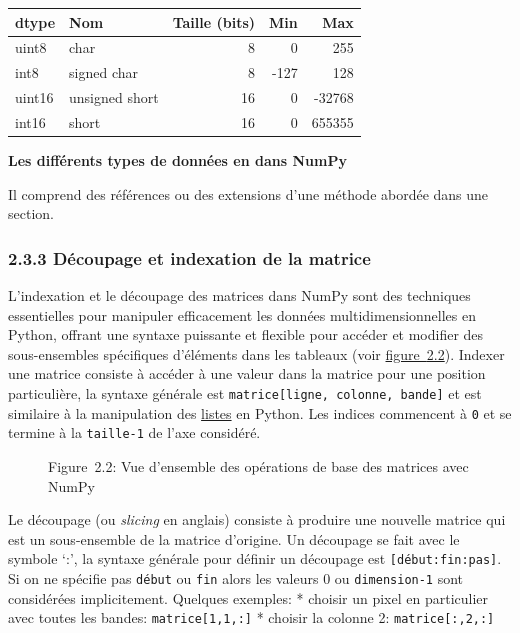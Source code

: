 \label{tbl-numpytype}
\begin{longtable}[]{@{}llrrr@{}}
\toprule\noalign{}
dtype & Nom & Taille (bits) & Min & Max \\
\midrule\noalign{}
\endhead
\bottomrule\noalign{}
\endlastfoot
uint8 & char & 8 & 0 & 255 \\
int8 & signed char & 8 & -127 & 128 \\
uint16 & unsigned short & 16 & 0 & -32768 \\
int16 & short & 16 & 0 & 655355 \\
\end{longtable}

\textbf{Les différents types de données en dans NumPy}

Il comprend des références ou des extensions d'une méthode abordée dans
une section.

\subsubsection{\texorpdfstring{{2.3.3} Découpage et indexation de la
matrice}{2.3.3 Découpage et indexation de la matrice}}\label{duxe9coupage-et-indexation-de-la-matrice}

L'indexation et le découpage des matrices dans NumPy sont des techniques
essentielles pour manipuler efficacement les données
multidimensionnelles en Python, offrant une syntaxe puissante et
flexible pour accéder et modifier des sous-ensembles spécifiques
d'éléments dans les tableaux (voir
\hyperref[fig-naturenumpy2]{figure~{2.2}}). Indexer une matrice consiste
à accéder à une valeur dans la matrice pour une position particulière,
la syntaxe générale est \texttt{matrice{[}ligne,\ colonne,\ bande{]}} et
est similaire à la manipulation des
\href{https://docs.python.org/fr/3/tutorial/introduction.html\#lists}{listes}
en Python. Les indices commencent à \texttt{0} et se termine à la
\texttt{taille-1} de l'axe considéré.

\label{fig-naturenumpy2}
\begin{figure}
\centering
{}
\caption{Figure~2.2: Vue d'ensemble des opérations de base des matrices
avec NumPy}
\end{figure}

Le découpage (ou \emph{slicing} en anglais) consiste à produire une
nouvelle matrice qui est un sous-ensemble de la matrice d'origine. Un
découpage se fait avec le symbole `:', la syntaxe générale pour définir
un découpage est \texttt{{[}début:fin:pas{]}}. Si on ne spécifie pas
\texttt{début} ou \texttt{fin} alors les valeurs 0 ou
\texttt{dimension-1} sont considérées implicitement. Quelques exemples:
* choisir un pixel en particulier avec toutes les bandes:
\texttt{matrice{[}1,1,:{]}} * choisir la colonne 2:
\texttt{matrice{[}:,2,:{]}}

